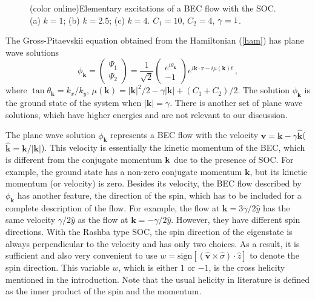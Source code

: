 \documentclass[doublecol]{epl2}
\begin{document}
\begin{figure}[!htb]
\caption{(color online)Elementary excitations of a BEC flow with the SOC.
(a) $k=1$; (b) $k=2.5$; (c) $k=4$. $C_1=10$, $C_2=4$, $\protect\gamma=1$. }
\label{3D}
\end{figure}

The Gross-Pitaevskii equation obtained from the Hamiltonian (\ref{ham}) has
plane wave solutions
\begin{equation}
\phi_{{\mathbf{k}}}=\left(%
\begin{array}{c}
\Psi_1 \\
\Psi_2 %
\end{array}%
\right)
=\frac{1}{\sqrt{2}}\left(%
\begin{array}{c}
e^{i\theta_{\mathbf{k}}} \\
- 1%
\end{array}%
\right)e^{i\mathbf{k}\cdot\mathbf{r}-i\mu(\mathbf{k}) t}\,,  \label{pwave}
\end{equation}
where $\tan\theta_{\mathbf{k}}=k_{x}/k_{y}$, $\mu(\mathbf{k})=|\mathbf{k}%
|^2/2-\gamma|\mathbf{k}|+(C_1+C_2)/2$. The solution $\phi_{{\mathbf{k}}}$ is
the ground state of the system when $|\mathbf{k}|=\gamma$. There is another
set of plane wave solutions, which have higher energies and are not relevant
to our discussion.

The plane wave solution $\phi _{{\mathbf{k}}}$ represents a BEC flow with
the velocity $\mathbf{v}=\mathbf{k}-\gamma \hat{\mathbf{k}}$($\hat{\mathbf{k}%
}=\mathbf{k}/|\mathbf{k}|$). This velocity is essentially the kinetic
momentum of the BEC, which is different from the conjugate momentum $\mathbf{%
k}$ due to the presence of SOC. For example, the ground state has a non-zero
conjugate momentum $\mathbf{k}$, but its kinetic momentum (or velocity) is
zero. Besides its velocity, the BEC flow described by $\phi _{{\mathbf{k}}}$
has another feature, the direction of the spin, which has to be included for
a complete description of the flow. For example, the flow at $\mathbf{k}%
=3\gamma /2\hat{y}$ has the same velocity $\gamma /2\hat{y}$ as the flow at $%
\mathbf{k}=-\gamma /2\hat{y}$. However, they have different spin directions.
With the Rashba type SOC, the spin direction of the eigenstate is always
perpendicular to the velocity and has only two choices. As a result, it is
sufficient and also very convenient to use $w=\mathrm{sign}[(\hat{\mathbf{v}}%
\times \hat{\sigma})\cdot \hat{z}]$ to denote the spin direction. This
variable $w$, which is either $1$ or $-1$, is the cross helicity mentioned
in the introduction. Note that the usual helicity in literature is defined
as the inner product of the spin and the momentum.
\end{document}
